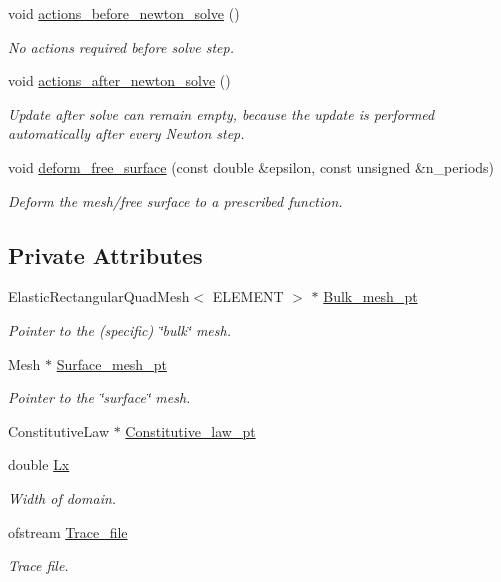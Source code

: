 \begin{DoxyCompactItemize}
void \hyperlink{classInterfaceProblem_ade63c8a74f666edf530460b989968b4f}{actions\+\_\+before\+\_\+newton\+\_\+solve} ()
\begin{DoxyCompactList}\small\item\em No actions required before solve step. \end{DoxyCompactList}\item 
void \hyperlink{classInterfaceProblem_aedc2e58b3d2f5f8c898a21ba2d245cee}{actions\+\_\+after\+\_\+newton\+\_\+solve} ()
\begin{DoxyCompactList}\small\item\em Update after solve can remain empty, because the update is performed automatically after every Newton step. \end{DoxyCompactList}\item 
void \hyperlink{classInterfaceProblem_a2319232b08d9df1ab473f6cbd40939d5}{deform\+\_\+free\+\_\+surface} (const double \&epsilon, const unsigned \&n\+\_\+periods)
\begin{DoxyCompactList}\small\item\em Deform the mesh/free surface to a prescribed function. \end{DoxyCompactList}\end{DoxyCompactItemize}
\subsection*{Private Attributes}
\begin{DoxyCompactItemize}
\item 
Elastic\+Rectangular\+Quad\+Mesh$<$ E\+L\+E\+M\+E\+NT $>$ $\ast$ \hyperlink{classInterfaceProblem_af580057bd9cc1d05a67401c9e5e178c2}{Bulk\+\_\+mesh\+\_\+pt}
\begin{DoxyCompactList}\small\item\em Pointer to the (specific) \char`\"{}bulk\char`\"{} mesh. \end{DoxyCompactList}\item 
Mesh $\ast$ \hyperlink{classInterfaceProblem_a011c7b4f2307ff909f64dc158e8fc674}{Surface\+\_\+mesh\+\_\+pt}
\begin{DoxyCompactList}\small\item\em Pointer to the \char`\"{}surface\char`\"{} mesh. \end{DoxyCompactList}\item 
Constitutive\+Law $\ast$ \hyperlink{classInterfaceProblem_a5bf645cbdbf7775ab6438be324caf3c3}{Constitutive\+\_\+law\+\_\+pt}
\item 
double \hyperlink{classInterfaceProblem_a9b5070b479a79546b983bd7027917e93}{Lx}
\begin{DoxyCompactList}\small\item\em Width of domain. \end{DoxyCompactList}\item 
ofstream \hyperlink{classInterfaceProblem_a45e3bf3b44bcbeefab21a3598bef6179}{Trace\+\_\+file}
\begin{DoxyCompactList}\small\item\em Trace file. \end{DoxyCompactList}\end{DoxyCompactItemize}


